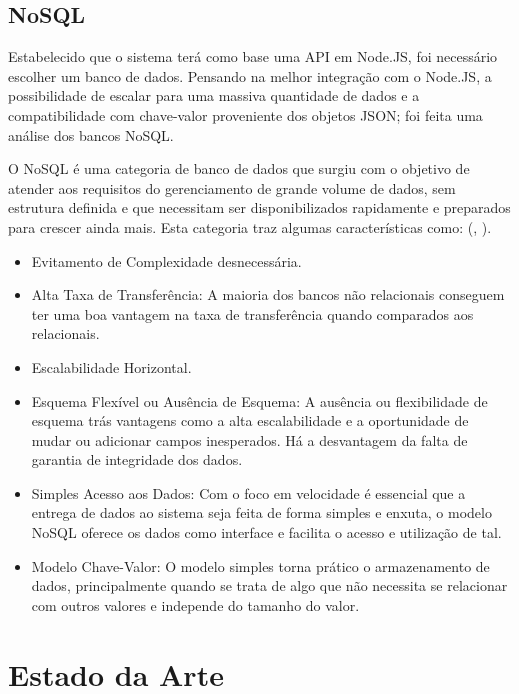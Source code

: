 \begin{enumerate}
\begin{enumerate}
\end{enumerate}

\subsection{NoSQL}

Estabelecido que o sistema terá como base uma API em Node.JS, foi necessário escolher um banco de dados. Pensando na melhor integração com o Node.JS, a possibilidade de escalar para uma massiva quantidade de dados e a compatibilidade com chave-valor proveniente dos objetos JSON; foi feita uma análise dos bancos NoSQL.

O NoSQL é uma categoria de banco de dados que surgiu com o objetivo de atender aos requisitos do gerenciamento de grande volume de dados, sem estrutura definida e que necessitam ser disponibilizados rapidamente e preparados para crescer ainda mais. Esta categoria traz algumas características como: (\citeauthor{loscio2011nosql}, \citeyear{loscio2011nosql}).

\begin{itemize}
    \item Evitamento de Complexidade desnecessária.
    \item Alta Taxa de Transferência: A maioria dos bancos não relacionais conseguem ter uma boa vantagem na taxa de transferência quando comparados aos relacionais.
    \item Escalabilidade Horizontal.
    \item Esquema Flexível ou Ausência de Esquema: A ausência ou flexibilidade de esquema trás vantagens como a alta escalabilidade e a oportunidade de mudar ou adicionar campos inesperados. Há a desvantagem da falta de garantia de integridade dos dados.
    \item Simples Acesso aos Dados: Com o foco em velocidade é essencial que a entrega de dados ao sistema seja feita de forma simples e enxuta, o modelo NoSQL oferece os dados como interface e facilita o acesso e utilização de tal.
    \item Modelo Chave-Valor: O modelo simples torna prático o armazenamento de dados, principalmente quando se trata de algo que não necessita se relacionar com outros valores e independe do tamanho do valor.
\end{itemize}
  
\section{Estado da Arte}  


\end{enumerate}
